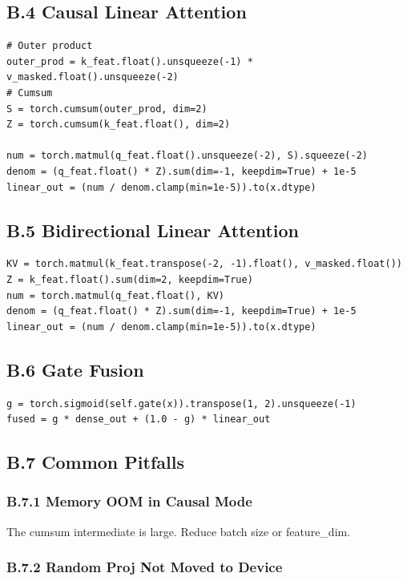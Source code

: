 \subsection{B.4 Causal Linear Attention}

\begin{lstlisting}
# Outer product
outer_prod = k_feat.float().unsqueeze(-1) * v_masked.float().unsqueeze(-2)
# Cumsum
S = torch.cumsum(outer_prod, dim=2)
Z = torch.cumsum(k_feat.float(), dim=2)

num = torch.matmul(q_feat.float().unsqueeze(-2), S).squeeze(-2)
denom = (q_feat.float() * Z).sum(dim=-1, keepdim=True) + 1e-5
linear_out = (num / denom.clamp(min=1e-5)).to(x.dtype)
\end{lstlisting}

\subsection{B.5 Bidirectional Linear Attention}

\begin{lstlisting}
KV = torch.matmul(k_feat.transpose(-2, -1).float(), v_masked.float())
Z = k_feat.float().sum(dim=2, keepdim=True)
num = torch.matmul(q_feat.float(), KV)
denom = (q_feat.float() * Z).sum(dim=-1, keepdim=True) + 1e-5
linear_out = (num / denom.clamp(min=1e-5)).to(x.dtype)
\end{lstlisting}

\subsection{B.6 Gate Fusion}

\begin{lstlisting}
g = torch.sigmoid(self.gate(x)).transpose(1, 2).unsqueeze(-1)
fused = g * dense_out + (1.0 - g) * linear_out
\end{lstlisting}

\subsection{B.7 Common Pitfalls}

\subsubsection{B.7.1 Memory OOM in Causal Mode}

The cumsum intermediate is large. Reduce batch size or feature\_dim.

\subsubsection{B.7.2 Random Proj Not Moved to Device}

